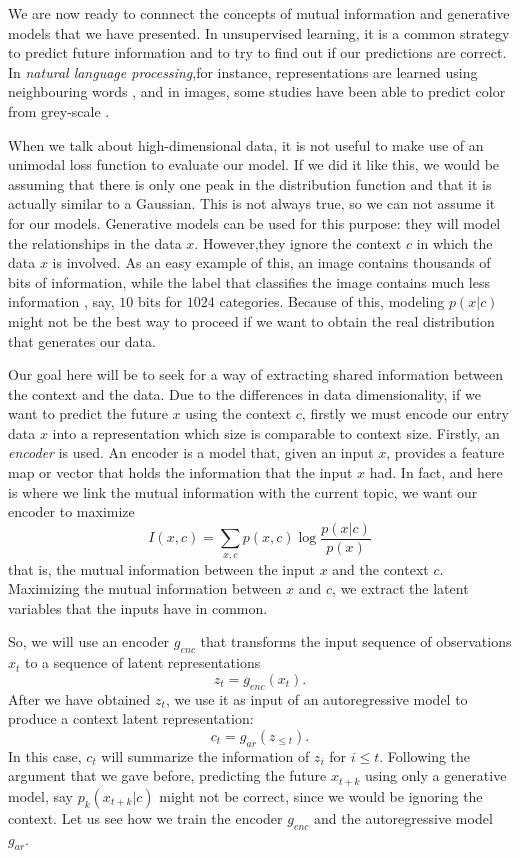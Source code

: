 We are now ready to connnect the concepts of mutual information and generative models that we have presented. In unsupervised learning,
it is a common strategy to predict future information and to try to find out if our predictions are correct.
In \emph{natural language processing},for instance, representations are learned 
using neighbouring words \citep{mikolov_efficient_2013}, and in images, some studies have been able to predict color from grey-scale \citep{doersch_unsupervised_2016}.

When we talk about high-dimensional data, it is not useful to make use of an unimodal loss function to evaluate our model. If we did it like this, we would be assuming that there is only
one peak in the distribution function and that it is actually similar to a Gaussian.  This is not always true, so we can not assume it for our models. Generative models can be used for this purpose:
they will model the relationships in the data $x$. However,they ignore the context $c$ in which the data $x$ is involved. As an easy example of this, an image contains thousands of bits of information,
while the label that classifies the image contains much less information , say, $10$ bits for $1024$ categories. Because of this, modeling $p(x|c)$ might not be the best way to proceed if we want
to obtain the real distribution that generates our data. 

Our goal here will be to seek for a way of extracting shared information between the context and the data. Due to the differences in data dimensionality, if we want to predict the future $x$ using the context $c$, firstly we must
encode our entry data $x$ into a representation which size is comparable to context size. Firstly, an \emph{encoder} is used. An encoder is a model that, given an input $x$, provides a feature map or vector that holds the information
that the input $x$ had. In fact, and here is where we link the mutual information with the current topic, we want our encoder to maximize
\begin{equation}\label{EQ:MI}
I(x,c) = \sum_{x,c}p(x,c)\log\frac{p(x|c)}{p(x)}
\end{equation}
that is, the mutual information between the input $x$ and the context $c$.  Maximizing the mutual information between $x$ and $c$, we extract the latent variables
that the inputs have in common.

So, we will use an encoder $g_{enc}$ that transforms the input sequence of observations $x_t$ to a sequence of latent representations
$$
z_t = g_{enc}(x_t).
$$
After we have obtained $z_t$, we use it as input of an autoregressive model to produce a context latent representation:
$$
c_t = g_{ar}(z_{\leq t}).
$$
In this case, $c_t$ will summarize the information of $z_i$ for $i \leq t$. Following the argument that we gave before, predicting the future $x_{t+k}$ using only a generative model, say $p_k(x_{t+k}|c)$
might not be correct, since we would be ignoring the context. Let us see how we train the encoder $g_{enc}$ and the autoregressive model $g_{ar}$.

